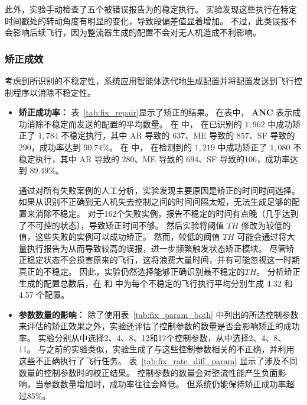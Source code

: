 此外，实验手动检查了五个被错误报告为的稳定执行。
实验发现这些执行在特定时间戳处的转动角度有明显的变化，导致段偏差值显着增加。
不过，此类误报不会影响后续飞行，因为整流器生成的配置不会对无人机造成不利影响。


\subsubsection{矫正成效}
考虑到所识别的不稳定性，系统应用智能体迭代地生成配置并将配置发送到飞行控制程序以消除不稳定性。

\begin{itemize}
    \item \textbf{矫正成功率：}
表~\ref{tab:fix_repair}显示了矫正的结果。
在表中，
     \textbf{ANC} 表示成功消除不稳定而发送的配置的平均数量。
在  中，
     \nyctea 在已识别的 $1,962$ 中成功矫正了 $1,784$ 不稳定执行，其中 AR 导致的 $637$、ME 导致的 $857$、SF 导致的 $290$，成功率达到 $90.74\%$。
在  中，
     \nyctea 在检测到的 $1,219$ 中成功矫正了 $1,080$ 不稳定执行，其中 AR 导致的 $280$、ME 导致的 $694$、SF 导致的$106$，成功率达到 $89.49\%$。



通过对所有失败案例的人工分析，实验发现主要原因是矫正的时间时间选择。
如果从识别不正确到无人机失去控制之间的时间间隔太短，\nyctea 无法生成足够的配置来消除不稳定。
对于162个失败实例，\nyctea 报告不稳定的时间有点晚（几乎达到了不可控的状态），导致矫正时间不够。
然后实验将阈值 $TH$ 修改为较低的值，这些失败的实例可以成功矫正。
然而，较低的阈值 $TH$ 可能会通过将大量执行报告为从而导致较高的误报，进一步频繁触发状态矫正模块。
尽管矫正稳定状态不会损害原来的飞行，这将浪费大量时间，并有可能忽视这一时期真正的不稳定。
因此，实验仍然选择能够正确识别最不稳定的$TH$。
分析矫正生成的配置总数后，\nyctea  在  和  中为每个不稳定的飞行执行平均分别生成 4.32 和 4.57 个配置。


     \item \textbf{参数数量的影响：}
除了使用表~\ref{tab:fix_param_both} 中列出的所选控制参数来评估\nyctea  的矫正效果之外，实验还评估了控制参数的数量是否会影响矫正的成功率。
实验分别从中选择2、4、8、12和17个控制参数，从中选择2、4、8、11。
与之前的实验类似，实验生成了与这些控制参数相关的不正确，并利用这些不正确执行了飞行任务。
表~\ref{tab:fix_rate_diff_param} 显示了涉及不同数量的控制参数时的校正结果。
控制参数的数量会对整流性能产生负面影响，当参数数量增加时，成功率往往会降低。
但系统仍能保持矫正成功率超过85\%。


\end{itemize}
